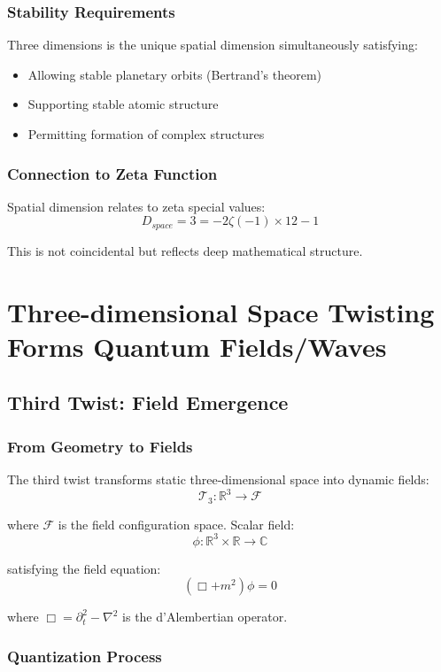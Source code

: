 \documentclass[11pt]{article}
\begin{document}
\subsubsection{Stability Requirements}

Three dimensions is the unique spatial dimension simultaneously satisfying:
\begin{itemize}
\item Allowing stable planetary orbits (Bertrand's theorem)
\item Supporting stable atomic structure
\item Permitting formation of complex structures
\end{itemize}

\subsubsection{Connection to Zeta Function}

Spatial dimension relates to zeta special values:
$$D_{space} = 3 = -2\zeta(-1) \times 12 - 1$$

This is not coincidental but reflects deep mathematical structure.

\section{Three-dimensional Space Twisting Forms Quantum Fields/Waves}

\subsection{Third Twist: Field Emergence}

\subsubsection{From Geometry to Fields}

The third twist transforms static three-dimensional space into dynamic fields:
$$\mathcal{T}_3: \mathbb{R}^3 \to \mathcal{F}$$

where $\mathcal{F}$ is the field configuration space. Scalar field:
$$\phi: \mathbb{R}^3 \times \mathbb{R} \to \mathbb{C}$$

satisfying the field equation:
$$(\Box + m^2)\phi = 0$$

where $\Box = \partial_t^2 - \nabla^2$ is the d'Alembertian operator.

\subsubsection{Quantization Process}
\end{document}
